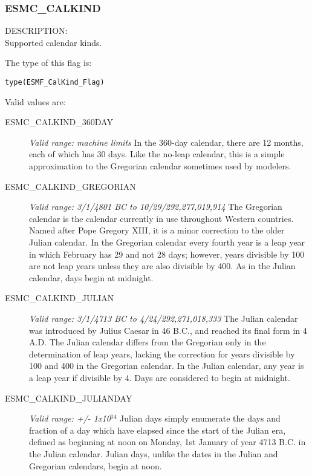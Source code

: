 
\label{subsec:Calendar_options}

\subsubsection{ESMC\_CALKIND}
\label{opt:calkindflag}


{\sf DESCRIPTION:\\}
Supported calendar kinds.

The type of this flag is:

{\tt type(ESMF\_CalKind\_Flag)}

Valid values are:
\begin{description}
      
\item [ESMC\_CALKIND\_360DAY] 
{\it Valid range: machine limits} 
\newline In the 360-day calendar, there are 12 months, each of which has 30 days.  
Like the no-leap calendar, this is a simple approximation to the Gregorian
calendar sometimes used by modelers.

\item [ESMC\_CALKIND\_GREGORIAN] 
{\it Valid range: 3/1/4801 BC to 10/29/292,277,019,914 }
\newline The Gregorian calendar is the calendar currently in use 
throughout Western countries.  Named after Pope Gregory XIII, it is a minor 
correction to the older Julian calendar. In the Gregorian calendar every
fourth year is a leap year in which February has 29 and not 28 days;
however, years divisible by 100 are not leap years unless they are also 
divisible  by 400.  As in the Julian calendar, days begin at midnight.

\item [ESMC\_CALKIND\_JULIAN]
{\it Valid range: 3/1/4713 BC to 4/24/292,271,018,333 } 
\newline The Julian calendar was introduced by Julius Caesar in 46 B.C., and 
reached its final form in 4 A.D.  The Julian calendar differs from the 
Gregorian only in the determination of leap years, lacking the correction 
for years divisible by 100 and 400 in the Gregorian calendar.  In the Julian 
calendar, any year is a leap year if divisible by 4.  Days are considered to 
begin at midnight.

\item [ESMC\_CALKIND\_JULIANDAY] 
{\it Valid range:  +/- 1x10$^{14}$} 
\newline Julian days simply enumerate the days and fraction of a day which 
have elapsed since the start of the Julian era, defined as beginning at noon 
on Monday, 1st January of year 4713 B.C. in the Julian calendar.  Julian days, 
unlike the dates in the Julian and Gregorian calendars, begin at noon.


\end{description}
